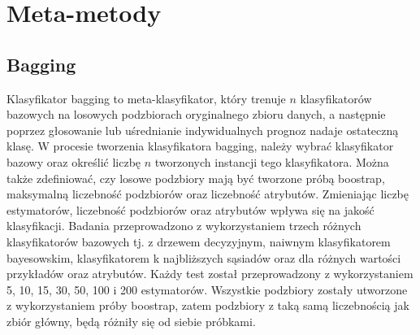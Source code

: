 \chapter{Meta-metody}
\section{Bagging}
Klasyfikator bagging to meta-klasyfikator, który trenuje $n$ klasyfikatorów bazowych na losowych podzbiorach oryginalnego zbioru danych, a następnie poprzez głosowanie lub uśrednianie indywidualnych prognoz nadaje ostateczną klasę. W procesie tworzenia klasyfikatora bagging, należy wybrać klasyfikator bazowy oraz określić liczbę $n$ tworzonych instancji tego klasyfikatora. Można także zdefiniować, czy losowe podzbiory mają być tworzone próbą boostrap, maksymalną liczebność podzbiorów oraz liczebność atrybutów. Zmieniając liczbę estymatorów, liczebność podzbiorów oraz atrybutów wpływa się na jakość klasyfikacji. Badania przeprowadzono z wykorzystaniem trzech różnych klasyfikatorów bazowych tj. z drzewem decyzyjnym, naiwnym klasyfikatorem bayesowskim, klasyfikatorem k najbliższych sąsiadów oraz dla różnych wartości przykładów oraz atrybutów. Każdy test został przeprowadzony z wykorzystaniem 5, 10, 15, 30, 50, 100 i 200 estymatorów. Wszystkie podzbiory zostały utworzone z wykorzystaniem próby boostrap, zatem podzbiory z taką samą liczebnością jak zbiór główny, będą różniły się od siebie próbkami.
  
